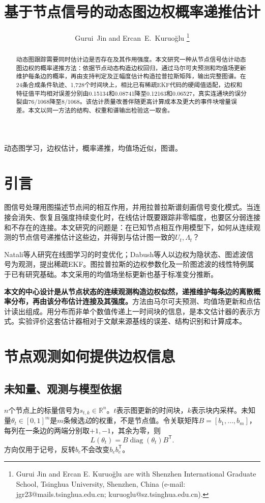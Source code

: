\documentclass[journal]{IEEEtran}
\newcommand{\T}{\mathsf T}
\begin{document}
\title{基于节点信号的动态图边权概率递推估计}
\author{Gurui~Jin and Ercan~E.~Kuruo\u{g}lu%
\thanks{Gurui Jin and Ercan E. Kuruo\u{g}lu are with Shenzhen International Graduate School, Tsinghua University, Shenzhen, China (e-mail: jgr23@mails.tsinghua.edu.cn; kuruoglu@sz.tsinghua.edu.cn).}}
\maketitle
\begin{abstract}
动态图跟踪需要同时估计边是否存在及其作用强度。本文研究一种从节点信号估计动态图边权的概率递推方法：依据节点动态构造边权回归，通过马尔可夫预测和均值场更新维护每条边的概率，再由支持判定及正幅度估计构造拉普拉斯矩阵，输出完整图谱。在24条合成条件轨迹、1,728个时间块上，相比已有稀疏EKF代码的硬阈值适配，边权和特征值平均相对误差分别由0.15134和0.08741降至0.12163和0.06527，真实连通块的误分裂由76/1068降至8/1068。该估计质量改善伴随更高计算成本及更大的事件块增量误差。本文以同一方法的结构、权重和谱输出检验这一取舍。
\end{abstract}
\begin{IEEEkeywords}
动态图学习，边权估计，概率递推，均值场近似，图谱。
\end{IEEEkeywords}
\section{引言}
图信号处理用图描述节点间的相互作用，并用拉普拉斯谱刻画信号变化模式\cite{shuman}。当连接会消失、恢复且强度持续变化时，在线估计既要跟踪非零幅度，也要区分弱连接和不存在的连接。本文研究的问题是：在已知节点相互作用模型下，如何从连续观测的节点信号递推估计这些边，并得到与估计图一致的$U_t,\Lambda_t$？

Natali等人研究在线图学习的时变优化\cite{natali}；Dabush等人以边权为隐状态、图滤波信号为观测，提出稀疏EKF\cite{dabush}。图拉普拉斯的边权参数化及一阶图滤波的线性特例属于已有研究基础。本文采用的均值场坐标更新也基于标准变分推断\cite{blei}。

\textbf{本文的中心设计是从节点状态的连续观测构造边权似然，递推维护每条边的离散概率分布，再由该分布估计连接及其强度。}方法由马尔可夫预测、均值场更新和点估计读出组成。用分布而非单个数值传递上一时间块的信息，是本文估计器的表示方式。实验评价这套估计器相对于文献来源基线的误差、结构识别和计算成本。

\section{节点观测如何提供边权信息}
\subsection{未知量、观测与模型依据}
$n$个节点上的标量信号为$s_{t,k}\in\mathbb R^n$。$t$表示图更新的时间块，$k$表示块内采样。未知量$\theta_t\in[0,1]^m$是$m$条候选\emph{边}的权重，不是节点值。令关联矩阵$B=[b_1,\ldots,b_m]$，每列在一条边的两端分别取$+1,-1$，其余为零，则
\begin{equation}
 L(\theta_t)=B\operatorname{diag}(\theta_t)B^\T.\label{eq:lap}
\end{equation}
方向仅用于记号，反转$b_e$不会改变$b_eb_e^\T$。
\end{document}

